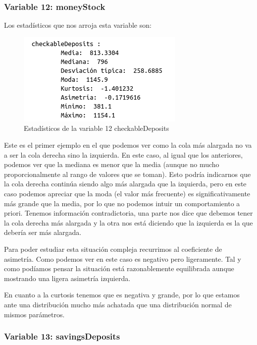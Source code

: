 \documentclass[12pt,a4paper]{article}
\begin{document}
\subsubsection*{Variable 12: moneyStock}

Los estadísticos que nos arroja esta variable son:

\begin{figure}[H]
	\centering
	\includegraphics[scale=0.7]{./Imagenes/estadisticos_checkableDeposits.png}
	\caption{Estadísticos de la variable 12 checkableDeposits}
\end{figure}

Este es el primer ejemplo en el que podemos ver como la cola más alargada no va a ser la cola derecha sino la izquierda. En este caso, al igual que los anteriores, podemos ver que la mediana es menor que la media (aunque no mucho proporcionalmente al rango de valores que se toman). Esto podría indicarnos que la cola derecha continúa siendo algo más alargada que la izquierda, pero en este caso podemos apreciar que la moda (el valor más frecuente) es significativamente más grande que la media, por lo que no podemos intuir un comportamiento a priori. Tenemos información contradictoria, una parte nos dice que debemos tener la cola derecha más alargada y la otra nos está diciendo que la izquierda es la que debería ser más alargada.

Para poder estudiar esta situación compleja recurrimos al coeficiente de asimetría. Como podemos ver en este caso es negativo pero ligeramente. Tal y como podíamos pensar la situación está razonablemente equilibrada aunque mostrando una ligera asimetría izquierda.

En cuanto a la curtosis tenemos que es negativa y grande, por lo que estamos ante una distribución mucho más achatada que una distribución normal de mismos parámetros.

\subsubsection*{Variable 13: savingsDeposits}
\end{document}
